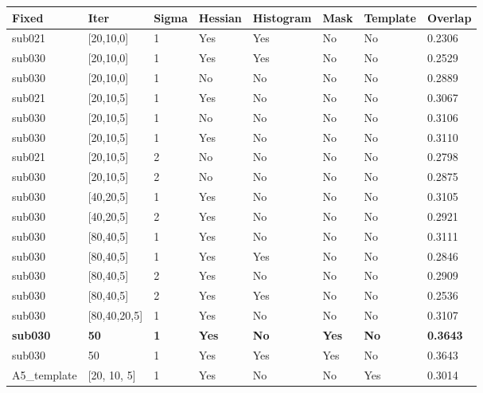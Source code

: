 \documentclass{article}
\begin{document}
\begin{par}
		\begin{tabular}{ | p{1.8cm} | p{1.5cm} | p{1.5cm} | p{1.5cm} | p{1.7cm} | p{1.5cm} | p{1.7cm} | p{1.5cm} |  }
			\hline 
			Fixed & Iter & Sigma & Hessian & Histogram & Mask & Template & Overlap \\ \hline \hline 
			sub021 & [20,10,0] & 1 & Yes & Yes & No & No & 0.2306 \\ \hline
			sub030 & [20,10,0] & 1 & Yes & Yes & No & No & 0.2529 \\ \hline
			sub030 & [20,10,0] & 1 & No & No & No & No & 0.2889 \\ \hline
			sub021 & [20,10,5] & 1 & Yes & No & No & No & 0.3067 \\ \hline
			sub030 & [20,10,5] & 1 & No & No & No & No & 0.3106 \\ \hline
			sub030 & [20,10,5] & 1 & Yes & No & No & No & 0.3110 \\ \hline
			sub021 & [20,10,5] & 2 & No & No & No & No & 0.2798 \\ \hline
			sub030 & [20,10,5] & 2 & No & No & No & No & 0.2875 \\ \hline
			sub030 & [40,20,5] & 1 & Yes & No & No & No & 0.3105 \\ \hline
			sub030 & [40,20,5] & 2 & Yes & No & No & No & 0.2921 \\ \hline
			sub030 & [80,40,5] & 1 & Yes & No & No & No & 0.3111 \\ \hline
			sub030 & [80,40,5] & 1 & Yes & Yes & No & No & 0.2846 \\ \hline
			sub030 & [80,40,5] & 2 & Yes & No & No & No & 0.2909 \\ \hline
			sub030 & [80,40,5] & 2 & Yes & Yes & No & No & 0.2536 \\ \hline
			sub030 & [80,40,20,5] & 1 & Yes & No & No & No & 0.3107 \\ \hline
			\textbf{sub030} & \textbf{50} & \textbf{1} & \textbf{Yes} & \textbf{No} & \textbf{Yes} & \textbf{No} & \textbf{0.3643} \\ \hline
			sub030 & 50 & 1 & Yes & Yes & Yes & No & 0.3643 \\ \hline
			A5\_template & [20, 10, 5] & 1 & Yes & No & No & Yes & 0.3014 \\ \hline
		\end{tabular}
		




	\end{par}
	
\end{document}
